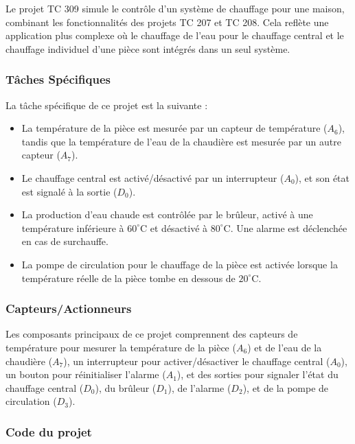\documentclass[a4paper,12pt]{report}
\begin{document}
Le projet TC 309 simule le contrôle d'un système de chauffage pour une maison, combinant les fonctionnalités des projets TC 207 et TC 208. Cela reflète une application plus complexe où le chauffage de l'eau pour le chauffage central et le chauffage individuel d'une pièce sont intégrés dans un seul système.

\subsubsection{Tâches Spécifiques}

La tâche spécifique de ce projet est la suivante :
\begin{itemize}
    \item La température de la pièce est mesurée par un capteur de température (\(A_6\)), tandis que la température de l'eau de la chaudière est mesurée par un autre capteur (\(A_7\)).
    \item Le chauffage central est activé/désactivé par un interrupteur (\(A_0\)), et son état est signalé à la sortie (\(D_0\)).
    \item La production d'eau chaude est contrôlée par le brûleur, activé à une température inférieure à \(60^\circ\mathrm{C}\) et désactivé à \(80^\circ\mathrm{C}\). Une alarme est déclenchée en cas de surchauffe.
    \item La pompe de circulation pour le chauffage de la pièce est activée lorsque la température réelle de la pièce tombe en dessous de \(20^\circ\mathrm{C}\).
\end{itemize}

\subsubsection{Capteurs/Actionneurs}

Les composants principaux de ce projet comprennent des capteurs de température pour mesurer la température de la pièce (\(A_6\)) et de l'eau de la chaudière (\(A_7\)), un interrupteur pour activer/désactiver le chauffage central (\(A_0\)), un bouton pour réinitialiser l'alarme (\(A_1\)), et des sorties pour signaler l'état du chauffage central (\(D_0\)), du brûleur (\(D_1\)), de l'alarme (\(D_2\)), et de la pompe de circulation (\(D_3\)).

\subsubsection{Code du projet}
\end{document}
